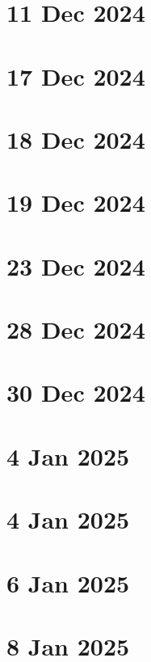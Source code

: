 \documentclass[a4paper]{report}
\begin{document}
   \chapter{11 Dec 2024}
   
   \chapter{17 Dec 2024}
   
   \chapter{18 Dec 2024}
   
   \chapter{19 Dec 2024}
   
   \chapter{23 Dec 2024}
   
   \chapter{28 Dec 2024}
   
   \chapter{30 Dec 2024}
   
   \chapter{4 Jan 2025}
   
   \chapter{4 Jan 2025}
   
   \chapter{6 Jan 2025}
   
   \chapter{8 Jan 2025}
   
\end{document}
